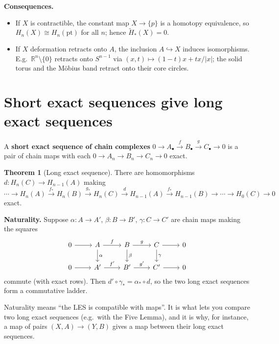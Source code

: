 \documentclass[11pt]{article}
\newcommand{\R}{\mathbb R}
\newcommand{\Hred}{\tilde H}
\theoremstyle{definition}
\newtheorem{thm}{Theorem}[section]
\begin{document}
\textbf{Consequences.}
\begin{itemize}
\item If $X$ is contractible, the constant map $X\to\{p\}$ is a homotopy equivalence, so $H_n(X)\cong H_n(\mathrm{pt})$ for all $n$; hence $\Hred_*(X)=0$.
\item If $X$ deformation retracts onto $A$, the inclusion $A\hookrightarrow X$ induces isomorphisms. E.g.\ $\R^n\setminus\{0\}$ retracts onto $S^{n-1}$ via $(x,t)\mapsto(1-t)x+tx/|x|$; the solid torus and the Möbius band retract onto their core circles.
\end{itemize}

\section{Short exact sequences give long exact sequences}

A \textbf{short exact sequence of chain complexes} $0\to A_\bullet\xrightarrow{f}B_\bullet\xrightarrow{g}C_\bullet\to0$ is a pair of chain maps with each $0\to A_n\to B_n\to C_n\to0$ exact.

\begin{thm}[Long exact sequence]
There are homomorphisms $d:H_n(C)\to H_{n-1}(A)$ making
\[\cdots\to H_n(A)\xrightarrow{f_*}H_n(B)\xrightarrow{g_*}H_n(C)\xrightarrow{d}H_{n-1}(A)\xrightarrow{f_*}H_{n-1}(B)\to\cdots\to H_0(C)\to0\]
exact.

\textbf{Naturality.} Suppose $\alpha:A\to A'$, $\beta:B\to B'$, $\gamma:C\to C'$ are chain maps making the squares
\[\begin{tikzcd}
0\ar[r] & A\ar[r,"f"]\ar[d,"\alpha"] & B\ar[r,"g"]\ar[d,"\beta"] & C\ar[r]\ar[d,"\gamma"] & 0\\
0\ar[r] & A'\ar[r,"f'"] & B'\ar[r,"g'"] & C'\ar[r] & 0
\end{tikzcd}\]
commute (with exact rows). Then $d'\circ\gamma_*=\alpha_*\circ d$, so the two long exact sequences form a commutative ladder.
\end{thm}
\begin{intuition}
Naturality means ``the LES is compatible with maps''. It is what lets you compare two long exact sequences (e.g.\ with the Five Lemma), and it is why, for instance, a map of pairs $(X,A)\to(Y,B)$ gives a map between their long exact sequences.
\end{intuition}
\end{document}
